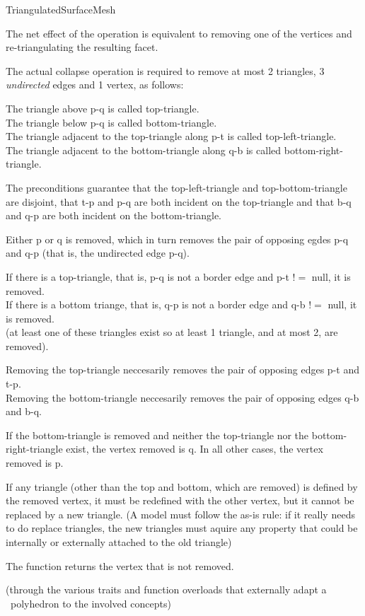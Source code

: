 \begin{ccRefConcept}{TriangulatedSurfaceMesh}
{  The net effect of the operation is equivalent to removing one of the vertices
  and re-triangulating the resulting facet.

  The actual collapse operation is required to remove at most 
  2 triangles, 3 {\em undirected} edges and 1 vertex, as follows:
  
  The triangle above p-q is called top-triangle.\\
  The triangle below p-q is called bottom-triangle.\\
  The triangle adjacent to the top-triangle along p-t is called top-left-triangle.\\
  The triangle adjacent to the bottom-triangle along q-b is called bottom-right-triangle.
  
  The preconditions guarantee that the top-left-triangle and top-bottom-triangle
  are disjoint, that t-p and p-q are both incident on the top-triangle and that
  b-q and q-p are both incident on the bottom-triangle.
      
  Either p or q is removed, which in turn removes the pair of opposing egdes 
  p-q and q-p (that is, the undirected edge p-q).

  If there is a top-triangle, that is, p-q is not a border edge and p-t $!=$ null, it is removed.\\
  If there is a bottom triange, that is, q-p is not a border edge and q-b $!=$ null, it is removed.\\
  (at least one of these triangles exist so at least 1 triangle, and at most 2, are removed).
  
  Removing the top-triangle neccesarily removes the pair of opposing edges p-t and t-p.\\
  Removing the bottom-triangle neccesarily removes the pair of opposing edges q-b and b-q.
      
  If the bottom-triangle is removed and neither the top-triangle nor
  the bottom-right-triangle exist, the vertex removed is q. In all other
  cases, the vertex removed is p.
  
  If any triangle (other than the top and bottom, which are removed) is defined by
  the removed vertex, it must be redefined with the other vertex, but it cannot
  be replaced by a new triangle. (A model must follow the as-is rule: if it really
  needs to do replace triangles, the new triangles must aquire any property 
  that could be internally or externally attached to the old triangle)
  
  The function returns the vertex that is not removed.
  }

\ccHasModels
{}
  (through the various traits and function overloads that externally adapt a \cgal\
  polyhedron to the involved concepts)

\end{ccRefConcept}

